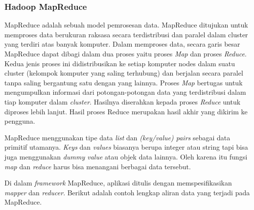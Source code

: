 \subsubsection{Hadoop MapReduce}
MapReduce adalah sebuah model pemrosesan data\cite{Lam:2010:HA:1965594}. MapReduce ditujukan untuk memproses data berukuran raksasa secara terdistribusi dan paralel dalam cluster yang terdiri atas banyak komputer. Dalam memproses data, secara garis besar MapReduce dapat dibagi dalam dua proses yaitu proses \textit{Map} dan proses \textit{Reduce}. Kedua jenis proses ini didistribusikan ke setiap komputer nodes dalam suatu cluster (kelompok komputer yang saling terhubung) dan berjalan secara paralel tanpa saling bergantung satu dengan yang lainnya. Proses \textit{Map} bertugas untuk mengumpulkan informasi dari potongan-potongan data yang terdistribusi dalam tiap komputer dalam \textit{cluster}. Hasilnya diserahkan kepada proses \textit{Reduce} untuk diproses lebih lanjut. Hasil proses Reduce merupakan hasil akhir yang dikirim ke pengguna. \cite{Dean:2008:MSD:1327452.1327492}

MapReduce menggunakan tipe data \textit{list} dan \textit{(key/value) pairs} sebagai data primitif utamanya. \textit{Keys} dan \textit{values} biasanya berupa integer atau string tapi bisa juga menggunakan \textit{dummy value} atau objek data lainnya. Oleh karena itu fungsi \textit{map} dan \textit{reduce} harus bisa menangani berbagai data tersebut.

Di dalam \textit{framework} MapReduce, aplikasi ditulis dengan memspesifikasikan \textit{mapper} dan \textit{reducer}. Berikut adalah contoh lengkap aliran data yang terjadi pada MapReduce.

